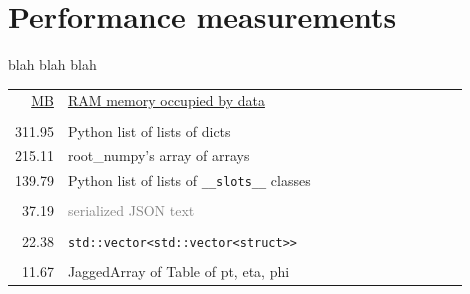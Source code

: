 \documentclass{webofc}
\begin{document}
\section{Performance measurements}

blah blah blah

\begin{table}[b]
\begin{minipage}{0.4\linewidth}\scriptsize
\begin{tabular}{r p{0.9\linewidth}}
\underline{MB} & \underline{RAM memory occupied by data} \\
& \\
311.95 & \textcolor{pythoncolor}{Python list of lists of dicts} \\
215.11 & \textcolor{rootnpcolor}{root\_numpy's array of arrays} \\
139.79 & \textcolor{pythoncolor}{Python list of lists of {\tt \_\_slots\_\_} classes} \\
& \\
 37.19 & \textcolor{gray}{serialized JSON text} \\
& \\
 22.38 & \textcolor{cppcolor}{{\tt\scriptsize std::vector<std::vector<struct>>}} \\
& \\
 11.67 & \textcolor{mycolor}{JaggedArray of Table of pt, eta, phi} \\
\end{tabular}


\end{minipage}
\end{table}
\end{document}
